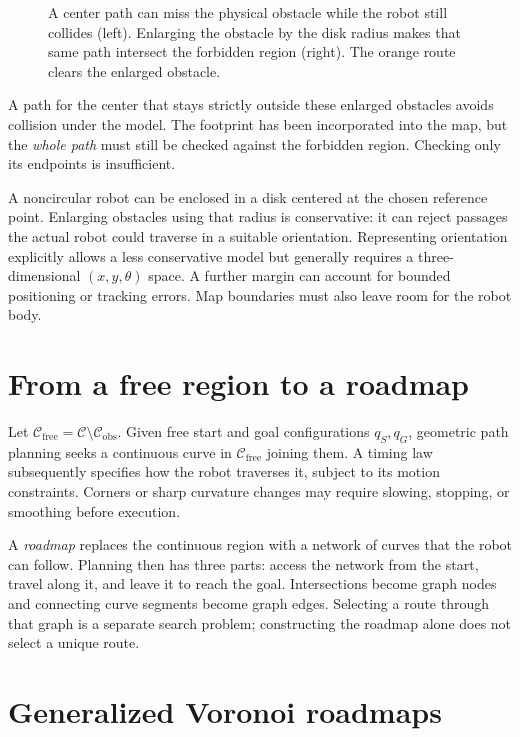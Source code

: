 \begin{figure}[htbp]
\centering
\caption{A center path can miss the physical obstacle while the robot
still collides (left). Enlarging the obstacle by the disk radius makes
that same path intersect the forbidden region (right). The orange route
clears the enlarged obstacle.}
\label{fig:l13-inflation}
\end{figure}

A path for the center that stays strictly outside these enlarged obstacles
avoids collision under the model. The footprint has been incorporated
into the map, but the \emph{whole path} must still be checked against the
forbidden region. Checking only its endpoints is insufficient.

A noncircular robot can be enclosed in a disk centered at the chosen
reference point. Enlarging obstacles using that radius is conservative:
it can reject passages the actual robot could traverse in a suitable
orientation. Representing orientation explicitly allows a less conservative
model but generally requires a three-dimensional $(x,y,\theta)$ space.
A further margin can account for bounded positioning or tracking errors.
Map boundaries must also leave room for the robot body.

\section{From a free region to a roadmap}
Let $\mathcal C_{\mathrm{free}}=\mathcal C\setminus\mathcal C_{\mathrm{obs}}$.
Given free start and goal configurations $q_S,q_G$, geometric path planning
seeks a continuous curve in $\mathcal C_{\mathrm{free}}$ joining them.
A timing law subsequently specifies how the robot traverses it, subject
to its motion constraints. Corners or sharp curvature changes may require
slowing, stopping, or smoothing before execution.

A \emph{roadmap} replaces the continuous region with a network of curves
that the robot can follow. Planning then has three parts: access the
network from the start, travel along it, and leave it to reach the goal.
Intersections become graph nodes and connecting curve segments become
graph edges. Selecting a route through that graph is a separate search
problem; constructing the roadmap alone does not select a unique route.

\section{Generalized Voronoi roadmaps}
